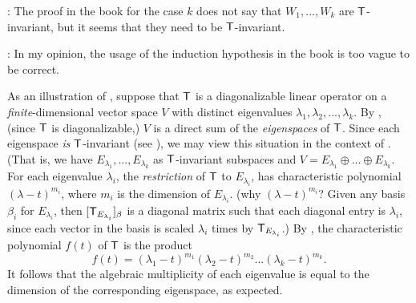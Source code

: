 \begin{note}
\RED{*}: The proof in the book for the case \(k\) does not say that \(W_1, ..., W_k\) are \(\textsf{T}\)-invariant, but it seems that they need to be \(\textsf{T}\)-invariant.

\RED{**}: In my opinion, the usage of the induction hypothesis in the book is too vague to be correct.
\end{note}

\begin{remark} \label{remark 5.4.4}
As an illustration of , suppose that \(\textsf{T}\) is a diagonalizable linear operator on a \emph{finite}-dimensional vector space \(V\) with distinct eigenvalues \(\lambda_1, \lambda_2, ..., \lambda_k\).
By , (since \(\textsf{T}\) is diagonalizable,) \(V\) is a direct sum of the \emph{eigenspaces} of \(\textsf{T}\).
Since each eigenspace \emph{is} \(\textsf{T}\)-invariant (see ), we may view this situation in the context of .
(That is, we have \(E_{\lambda_1}, ..., E_{\lambda_k}\) as \(\textsf{T}\)-invariant subspaces and \(V = E_{\lambda_1} \oplus ... \oplus E_{\lambda_k}\).
For each eigenvalue \(\lambda_i\), the \emph{restriction} of \(\textsf{T}\) to \(E_{\lambda_i}\), has characteristic polynomial \((\lambda - t)^{m_i}\), where \(m_i\) is the dimension of \(E_{\lambda_i}\).
(why \((\lambda - t)^{m_i}\)? Given any basis \(\beta_i\) for \(E_{\lambda_i}\), then \([\textsf{T}_{E_{\lambda_i}}]_{\beta}\) is a diagonal matrix such that each diagonal entry is \(\lambda_i\), since each vector in the basis is scaled \(\lambda_i\) times by \(\textsf{T}_{E_{\lambda_i}}\).)
By , the characteristic polynomial \(f(t)\) of \(\textsf{T}\) is the product
\[
    f(t) = (\lambda_1 - t)^{m_1} (\lambda_2 - t)^{m_2} ... (\lambda_k - t)^{m_k}.
\]
It follows that the algebraic multiplicity of each eigenvalue is equal to the dimension of the corresponding eigenspace, as expected.
\end{remark}

